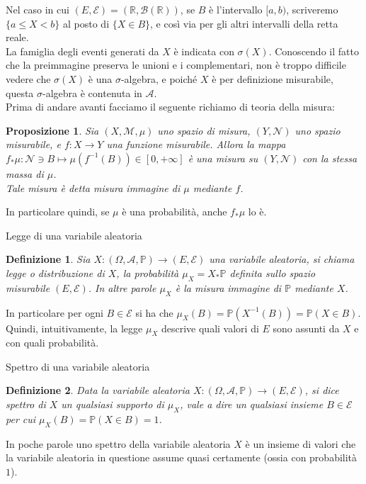 \documentclass[11pt]{book}
\theoremstyle{Definizione}
\newtheorem*{mydef}{Definizione}
\theoremstyle{TeoremaProposizioneLemmaCorollario}
\newtheorem{mypropo}[myteo]{Proposizione}
\theoremstyle{OsservazioneNota}
\newcommand{\R}{\mathbb{R}}
\renewcommand{\P}{\mathbb{P}}
\newcommand{\Borel}{\mathcal{B}}
\begin{document}
Nel caso in cui $(E,\mathcal{E}) = (\R,\Borel(\R))$, se $B$ è l'intervallo $[a,b)$, scriveremo $\{a\leq X < b\}$ al posto di $\{X\in B\}$, e così via per gli altri intervalli della retta reale.\\
La famiglia degli eventi generati da $X$ è indicata con $\sigma(X)$. Conoscendo il fatto che la preimmagine preserva le unioni e i complementari, non è troppo difficile vedere che $\sigma(X)$ è una $\sigma$-algebra, e poiché $X$ è per definizione misurabile, questa $\sigma$-algebra è contenuta in $\mathcal{A}$.\\
Prima di andare avanti facciamo il seguente richiamo di teoria della misura:
\begin{boxpro}
\begin{mypropo}
Sia $(X,\mathcal{M},\mu)$ uno spazio di misura, $(Y,\mathcal{N})$ uno spazio misurabile, e $f:X \longrightarrow Y$ una funzione misurabile. Allora la mappa $f_*\mu:\mathcal{N}\ni B \longmapsto \mu(f^{-1}(B))\in [0,+\infty]$ è una misura su $(Y,\mathcal{N})$ con la stessa massa di $\mu$.\\
Tale misura è detta misura immagine di $\mu$ mediante $f$.
\end{mypropo}
\end{boxpro}
\noindent
In particolare quindi, se $\mu$ è una probabilità, anche $f_*\mu$ lo è.
\begin{boxdef}{Legge di una variabile aleatoria}
\begin{mydef}
Sia $X:(\Omega,\mathcal{A},\P)\longrightarrow (E,\mathcal{E})$ una variabile aleatoria, si chiama legge o distribuzione di $X$, la probabilità $\mu_X = X_*\P$ definita sullo spazio misurabile $(E,\mathcal{E})$. In altre parole $\mu_X$ è la misura immagine di $\P$ mediante $X$. 
\end{mydef}
\end{boxdef}
\noindent
In particolare per ogni $B\in \mathcal{E}$ si ha che $\mu_X(B) = \P(X^{-1}(B)) = \P(X\in B)$. Quindi, intuitivamente, la legge $\mu_X$ descrive quali valori di $E$ sono assunti da $X$ e con quali probabilità.
\begin{boxdef}{Spettro di una variabile aleatoria}
\begin{mydef}
Data la variabile aleatoria $X:(\Omega,\mathcal{A},\P)\longrightarrow (E,\mathcal{E})$, si dice spettro di $X$ un qualsiasi supporto di $\mu_X$, vale a dire un qualsiasi insieme $B\in \mathcal{E}$ per cui $\mu_X(B) = \P(X\in B) = 1$.
\end{mydef}
\end{boxdef}
\noindent
In poche parole uno spettro della variabile aleatoria $X$ è un insieme di valori che la variabile aleatoria in questione assume quasi certamente (ossia con probabilità $1$).\\
\end{document}
